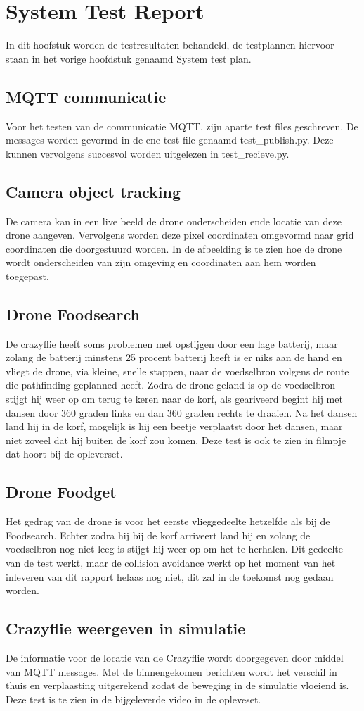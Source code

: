 \section{System Test Report}
In dit hoofstuk worden de testresultaten behandeld, de testplannen hiervoor staan in het vorige hoofdstuk genaamd System test plan.

\subsection{MQTT communicatie}
Voor het testen van de communicatie MQTT, zijn aparte test files geschreven. De messages worden gevormd in de ene test file genaamd test\_publish.py. Deze kunnen vervolgens succesvol worden uitgelezen in test\_recieve.py.

\subsection{Camera object tracking}
De camera kan in een live beeld de drone onderscheiden ende locatie van deze drone aangeven. Vervolgens worden deze pixel coordinaten omgevormd naar grid coordinaten die doorgestuurd worden. In de afbeelding is te zien hoe de drone wordt onderscheiden van zijn omgeving en coordinaten aan hem worden toegepast.

\subsection{Drone Foodsearch}
De crazyflie heeft soms problemen met opstijgen door een lage batterij, maar zolang de batterij minstens 25 procent batterij heeft is er niks aan de hand en vliegt de drone, via kleine, snelle stappen, naar de voedselbron volgens de route die pathfinding geplanned heeft. Zodra de drone geland is op de voedselbron stijgt hij weer op om terug te keren naar de korf, als geariveerd begint hij met dansen door 360 graden links en dan 360 graden rechts te draaien. Na het dansen land hij in de korf, mogelijk is hij een beetje verplaatst door het dansen, maar niet zoveel dat hij buiten de korf zou komen.
Deze test is ook te zien in filmpje dat hoort bij de opleverset.

\subsection{Drone Foodget}
Het gedrag van de drone is voor het eerste vlieggedeelte hetzelfde als bij de Foodsearch. Echter zodra hij bij de korf arriveert land hij en zolang de voedselbron nog niet leeg is stijgt hij weer op om het te herhalen.
Dit gedeelte van de test werkt, maar de collision avoidance werkt op het moment van het inleveren van dit rapport helaas nog niet, dit zal in de toekomst nog gedaan worden.

\subsection{Crazyflie weergeven in simulatie}
De informatie voor de locatie van de Crazyflie wordt doorgegeven door middel van MQTT messages. Met de binnengekomen berichten wordt het verschil in thuis en verplaasting uitgerekend zodat de beweging in de simulatie vloeiend is. Deze test is te zien in de bijgeleverde video in de opleveset.